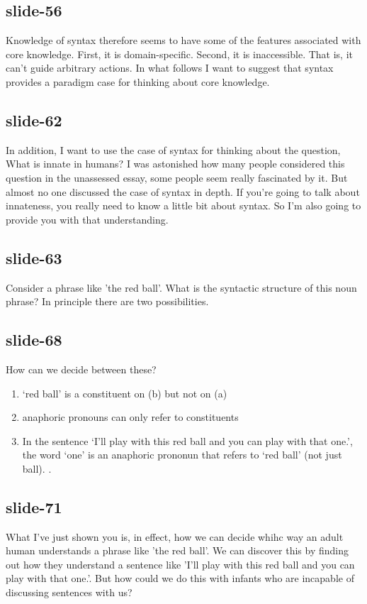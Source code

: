 \documentclass[12pt,\papersize]{extarticle}
\begin{document}
 
\subsection{slide-56}
Knowledge of syntax therefore seems to have some of the features associated with core knowledge.
First, it is domain-specific.
Second, it is inaccessible. That is, it can't guide arbitrary actions.
In what follows I want to suggest that syntax provides a paradigm case for thinking about core knowledge.
 
 
\subsection{slide-62}
In addition, I want to use the case of syntax for thinking about the question, What is innate in humans?
I was astonished how many people considered this question in the unassessed essay, some people seem really fascinated by it.
But almost no one discussed the case of syntax in depth. If you're going to talk about innateness, you really need to know a little bit about syntax.
So I'm also going to provide you with that understanding.
 
 
\subsection{slide-63}
Consider a phrase like 'the red ball'.
What is the syntactic structure of this noun phrase?
In principle there are two possibilities.
 
 
\subsection{slide-68}
How can we decide between these?
\begin{enumerate} \item ‘red ball’ is a constituent on (b) but not on (a) \item anaphoric pronouns can only refer to constituents \item In the sentence ‘I’ll play with this red ball and you can play with that one.’, the word ‘one’ is an anaphoric prononun that refers to ‘red ball’ (not just ball). \citep{lidz:2003_what,lidz:2004_reaffirming}.
\end{enumerate}
 
 
\subsection{slide-71}
What I've just shown you is, in effect, how we can decide whihc way an adult human understands a phrase like 'the red ball'.
We can discover this by finding out how they understand a sentence like 'I’ll play with this red ball and you can play with that one.'.
But how could we do this with infants who are incapable of discussing sentences with us?
 
\end{document}

